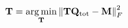 \documentclass[preview]{standalone}
\begin{document}
\begin{align*}
\special{dvisvgm:raw <g id='unique000'>}\mathbf T=\underset{\mathbf T}{\operatorname*{arg\,min}}\left\|\mathbf T\mathbf Q_{\rm tot}-\mathbf M\right\|_F^2\special{dvisvgm:raw </g>}
\end{align*}
\end{document}

